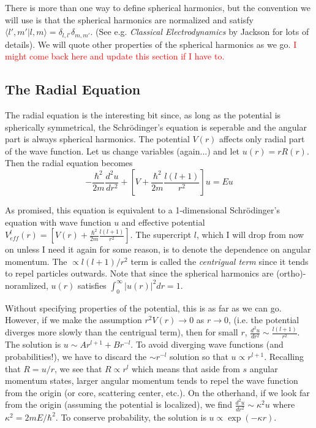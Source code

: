 \documentclass[prb,aps,11pt,superscriptaddress,floatfix]{revtex4-2}
\begin{document}
There is more than one way to define spherical harmonics, but the convention we will use is that the spherical harmonics are normalized and satisfy $\langle l',m'|l,m\rangle=\delta_{l,l'}\delta_{m,m'}$. (See e.g. \emph{Classical Electrodynamics} by Jackson for lots of details). We will quote other properties of the spherical harmonics as we go. \textcolor{red}{I might come back here and update this section if I have to.}

\subsection{The Radial Equation}

The radial equation is the interesting bit since, as long as the potential is spherically symmetrical, the Schr\"odinger's equation is seperable and the angular part is always spherical harmonics. The potential $V(r)$ affects only radial part of the wave function. Let us change variables (again...) and let $u(r)=rR(r)$. Then the radial equation becomes
\begin{equation}
  -\frac{\hbar^2}{2m}\frac{d^2u}{dr^2}+\left[ V+\frac{\hbar^2}{2m}\frac{l(l+1)}{r^2}\right] u=Eu
  \label{eq:radial_u}
\end{equation}

As promised, this equation is equivalent to a 1-dimensional Schr\"odinger's equation with wave function $u$ and effective potential $V^l_{eff}(r)=\left[V(r)+\frac{\hbar^2}{2m}\frac{l(l+1)}{r^2}\right]$. The supercript $l$, which I will drop from now on unless I need it again for some reason, is to denote the dependence on angular momentum. The $\propto l(l+1)/r^2$ term is called the \emph{centrigual term} since it tends to repel particles outwards. Note that since the spherical harmonics are (ortho)-noramlized, $u(r)$ satisfies $\int_0^{\infty} |u(r)|^2 dr=1$. 

Without specifying properties of the potential, this is as far as we can go. However, if we make the assumption $r^2V(r)\rightarrow 0$ as $r\rightarrow 0$, (i.e. the potential diverges more slowly than the centrigual term), then for small $r$, $\frac{d^2u}{dr^2} \sim \frac{l(l+1)}{r^2}$. The solution is $ u \sim A r^{l+1}+Br^{-l}$. To avoid diverging wave functions (and probabilities!), we have to discard the $\sim r^{-l}$ solution so that $u \propto r^{l+1}$. Recalling that $R=u/r$, we see that $R\propto r^l$ which means that aside from $s$ angular momentum states, larger angular momentum tends to repel the wave function from the origin (or core, scattering center, etc.). On the otherhand, if we look far from the origin (assuming the potential is localized), we find $\frac{d^2u}{dr^2} \sim \kappa^2 u$ where $\kappa^2=2mE/\hbar^2$. To conserve probability, the solution is $u\propto \exp(-\kappa r)$. 
\end{document}

